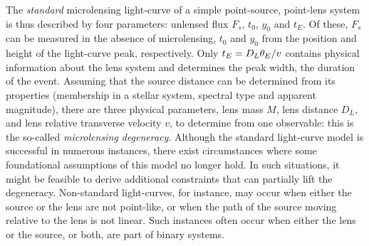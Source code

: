 The \emph{standard} microlensing light-curve of a simple point-source, point-lens system is thus described by four parameters: unlensed flux $F_s$, $t_0$, $y_0$ and $t_E$. Of these, $F_s$ can be measured in the absence of microlensing, $t_0$ and $y_0$ from the position and height of the light-curve peak, respectively. Only $t_E= D_L \theta_E / v$ contains physical information about the lens system and determines the peak width, \ie the duration of the event. Assuming that the source distance can be determined from its properties (membership in a stellar system, spectral type and apparent magnitude), there are three physical parameters, lens mass $M$, lens distance $D_L$, and lens relative transverse velocity $v$, to determine from one observable: this is the so-called \emph{microlensing degeneracy}. 
Although the standard light-curve model is successful in numerous instances, there exist circumstances where some foundational assumptions of this model no longer hold. In such situations, it might be feasible to derive additional constraints that can partially lift the degeneracy. Non-standard light-curves, for instance, may occur when either the source or the lens are not point-like, or when the path of the source moving relative to the lens is not linear. Such instances often occur when either the lens or the source, or both, are part of binary systems.